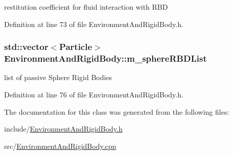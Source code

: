 restitution coefficient for fluid interaction with RBD 



Definition at line 73 of file EnvironmentAndRigidBody.h.

\hypertarget{class_environment_and_rigid_body_a1360e9aac7908d4a130338ee3e8c04cb}{
\subsubsection[{m\_\-sphereRBDList}]{\setlength{\rightskip}{0pt plus 5cm}std::vector$<${\bf Particle}$>$ {\bf EnvironmentAndRigidBody::m\_\-sphereRBDList}}}
\label{class_environment_and_rigid_body_a1360e9aac7908d4a130338ee3e8c04cb}


list of passive Sphere Rigid Bodies 



Definition at line 76 of file EnvironmentAndRigidBody.h.



The documentation for this class was generated from the following files:\begin{DoxyCompactItemize}
\item 
include/\hyperlink{_environment_and_rigid_body_8h}{EnvironmentAndRigidBody.h}\item 
src/\hyperlink{_environment_and_rigid_body_8cpp}{EnvironmentAndRigidBody.cpp}\end{DoxyCompactItemize}
